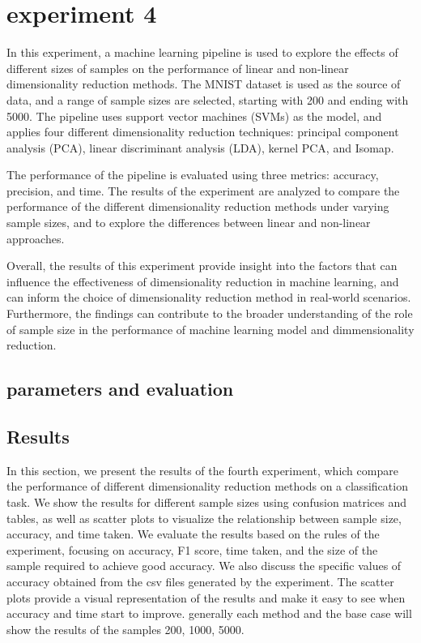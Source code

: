 \section{experiment 4}\label{sec:experiment-4}

In this experiment, a machine learning pipeline is used to explore the effects of different sizes of samples on the performance of linear and non-linear dimensionality reduction methods. The MNIST dataset is used as the source of data, and a range of sample sizes are selected, starting with 200 and ending with 5000. The pipeline uses support vector machines (SVMs) as the model, and applies four different dimensionality reduction techniques: principal component analysis (PCA), linear discriminant analysis (LDA), kernel PCA, and Isomap.

The performance of the pipeline is evaluated using three metrics: accuracy, precision, and time. The results of the experiment are analyzed to compare the performance of the different dimensionality reduction methods under varying sample sizes, and to explore the differences between linear and non-linear approaches.

Overall, the results of this experiment provide insight into the factors that can influence the effectiveness of dimensionality reduction in machine learning, and can inform the choice of dimensionality reduction method in real-world scenarios. Furthermore, the findings can contribute to the broader understanding of the role of sample size in the performance of machine learning model and dimmensionality reduction.

\subsection*{parameters and evaluation}





\subsection{Results}\label{subsec:experiment_4_results}
In this section, we present the results of the fourth experiment, which compare the performance of different dimensionality reduction methods on a classification task. We show the results for different sample sizes using confusion matrices and tables, as well as scatter plots to visualize the relationship between sample size, accuracy, and time taken. We evaluate the results based on the rules of the experiment, focusing on accuracy, F1 score, time taken, and the size of the sample required to achieve good accuracy. We also discuss the specific values of accuracy obtained from the csv files generated by the experiment. The scatter plots provide a visual representation of the results and make it easy to see when accuracy and time start to improve. generally each method and the base case will show the results of the samples 200, 1000, 5000.

